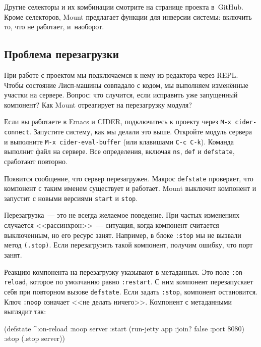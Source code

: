 Другие селекторы и их комбинации смотрите на странице проекта в~GitHub. Кроме
селекторов, Mount предлагает функции для инверсии системы: включить то, что не
работает, и~наоборот.

\subsection{Проблема перезагрузки}

При работе с проектом мы подключаемся к нему из редактора через REPL. Чтобы
состояние Лисп-машины совпадало с кодом, мы выполняем изменённые участки на
сервере. Вопрос: что случится, если исправить уже запущенный компонент? Как
Mount отреагирует на перезагрузку модуля?


Если вы работаете в Emacs и CIDER, подключитесь к проекту через
\verb|M-x cider-connect|. Запустите систему, как мы делали это выше.
Откройте модуль сервера и выполните \verb|M-x cider-eval-buffer|
(или клавишами \verb|C-c C-k|). Команда выполнит файл на сервере.
Все определения, включая \verb|ns|, \verb|def| и \verb|defstate|,
сработают повторно.

Появится сообщение, что сервер перезагружен. Макрос \verb|defstate| проверяет,
что компонент с таким именем существует и работает. Mount выключит компонент и
запустит с новыми версиями \verb|start| и \verb|stop|.

Перезагрузка~--- это не всегда желаемое поведение. При частых изменениях случается
<<рассинхрон>>~--- ситуация, когда компонент считается выключенным, но его
ресурс занят. Например, в блоке \verb|:stop| мы не вызвали метод
\verb|(.stop)|. Если перезагрузить такой компонент, получим ошибку, что порт
занят.

Реакцию компонента на перезагрузку указывают в метаданных. Это поле
\verb|:on-reload|, которое по умолчанию равно \verb|:restart|. С ним
компонент перезапускает себя при повторном вызове \verb|defstate|. Если задать
\verb|:stop|, компонент остановится. Ключ \verb|:noop| означает <<не делать
ничего>>. Компонент с метаданными выглядит так:

\ifx\DEVICETYPE\MOBILE

\begin{english}
  \begin{clojure}
(defstate
  ^{:on-reload :noop}
  server
  :start (run-jetty app
           {:join? false :port 8080})
  :stop (.stop server))
  \end{clojure}
\end{english}

